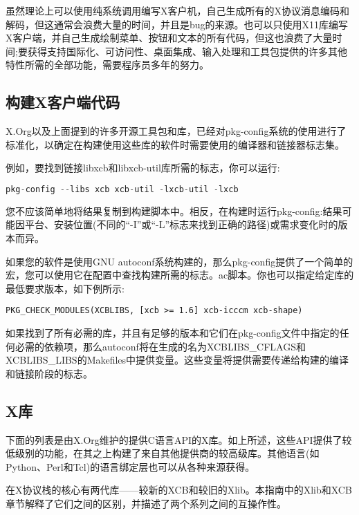 虽然理论上可以使用纯系统调用编写X客户机，自己生成所有的X协议消息编码和解码，但这通常会浪费大量的时间，并且是bug的来源。也可以只使用X11库编写X客户端，并自己生成绘制菜单、按钮和文本的所有代码，但这也浪费了大量时间;要获得支持国际化、可访问性、桌面集成、输入处理和工具包提供的许多其他特性所需的全部功能，需要程序员多年的努力。

\subsection{构建X客户端代码}

X.Org以及上面提到的许多开源工具包和库，已经对pkg-config系统的使用进行了标准化，以确定在构建使用这些库的软件时需要使用的编译器和链接器标志集。

\noindent 例如，要找到链接libxcb和libxcb-util库所需的标志，你可以运行:

\begin{lstlisting}[language=C]
pkg-config --libs xcb xcb-util -lxcb-util -lxcb
\end{lstlisting}

您不应该简单地将结果复制到构建脚本中。相反，在构建时运行pkg-config:结果可能因平台、安装位置(不同的“-I”或“-L”标志来找到正确的路径)或需求变化时的版本而异。

\noindent 如果您的软件是使用GNU autoconf系统构建的，那么pkg-config提供了一个简单的宏，您可以使用它在配置中查找构建所需的标志。ac脚本。你也可以指定给定库的最低要求版本，如下例所示:

\begin{lstlisting}
PKG_CHECK_MODULES(XCBLIBS, [xcb >= 1.6] xcb-icccm xcb-shape)
\end{lstlisting}

如果找到了所有必需的库，并且有足够的版本和它们在pkg-config文件中指定的任何必需的依赖项，那么autoconf将在生成的名为XCBLIBS\_CFLAGS和XCBLIBS\_LIBS的Makefiles中提供变量。这些变量将提供需要传递给构建的编译和链接阶段的标志。

\subsection{X库}

下面的列表是由X.Org维护的提供C语言API的X库。如上所述，这些API提供了较低级别的功能，在其之上构建了来自其他提供商的较高级库。其他语言(如Python、Perl和Tcl)的语言绑定层也可以从各种来源获得。

在X协议栈的核心有两代库——较新的XCB和较旧的Xlib。本指南中的Xlib和XCB章节解释了它们之间的区别，并描述了两个系列之间的互操作性。

